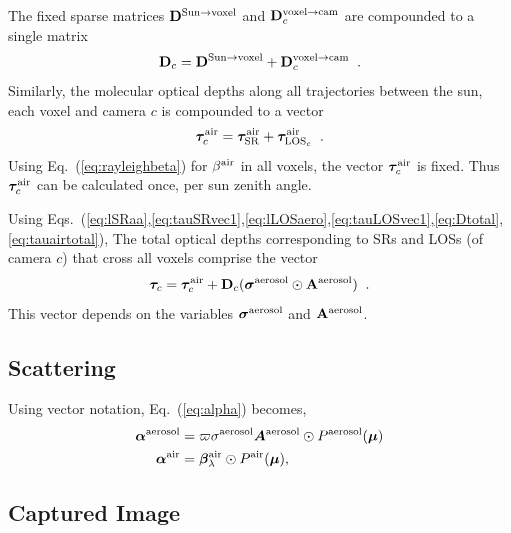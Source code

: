 \documentclass[10pt,twocolumn,letterpaper]{article}
\newcommand{\vect}[1]{\bm{#1}}
\newcommand{\mat}[1]{\bm{#1}}
\begin{document}
The fixed sparse matrices ${\bf D}^{\mathrm{Sun \rightarrow voxel}}$ and 
${\bf D}^{\mathrm{voxel \rightarrow cam}}_c$ are compounded to a single matrix
\begin{equation}
  {\bf D}_c=
  {\bf D}^{\mathrm{Sun \rightarrow voxel}}+
  {\bf D}^{\mathrm{voxel \rightarrow cam}}_c
  \;\;.
  \label{eq:Dtotal}
\end{equation}
Similarly, the molecular optical depths along all trajectories between the sun, each voxel 
and camera $c$ is compounded to a vector
\begin{equation}
  \vect{\tau}_c^{\rm air}=
  \vect{\tau}_{\rm SR}^{\rm air}+
  \vect{\tau}_{{\rm LOS}_c}^{\rm air}
  \;\;.
  \label{eq:tauairtotal}
\end{equation}
Using Eq.~(\ref{eq:rayleighbeta}) for $\beta^{\rm air}$ in all voxels,
the vector $\vect{\tau}_c^{\rm air}$ is fixed. Thus $\vect{\tau}_c^{\rm air}$ can 
be calculated once, per sun zenith angle.

Using Eqs.~(\ref{eq:lSRaa},\ref{eq:tauSRvec1},\ref{eq:lLOSaero},\ref{eq:tauLOSvec1},\ref{eq:Dtotal},\ref{eq:tauairtotal}),
The total optical depths corresponding to SRs and LOSs (of camera $c$) that cross all voxels comprise the vector
\begin{equation}
  \vect{\tau}_c= \vect{\tau}_c^{\rm air} 
               + {\bf D}_c (\vect{\sigma}^{\rm aerosol} \odot {\bf A}^{\rm aerosol})
  \;\;.
  \label{eq:tautotal}
\end{equation}
This vector depends on the variables $\vect{\sigma}^{\rm aerosol}$ and ${\bf A}^{\rm aerosol}$.

\subsection{Scattering}
\label{sec:scattering}


\noindent Using vector notation, Eq.~(\ref{eq:alpha}) becomes,
\begin{align}
  \vect{\alpha}^{\rm aerosol} &= \varpi \sigma^{\rm aerosol}
  \mat{A}^{\rm
    aerosol} \odot P^{\rm aerosol}(\vect{\mu}) \nonumber \\
  \vect{\alpha}^{\rm air} &= \vect{\beta}^{\rm air}_{\lambda} \odot
  P^{\rm air}(\vect{\mu}),
  \label{eq:alpha_matrix}
\end{align}



\subsection{Captured Image}
\label{sec:captured-image}
\end{document}
